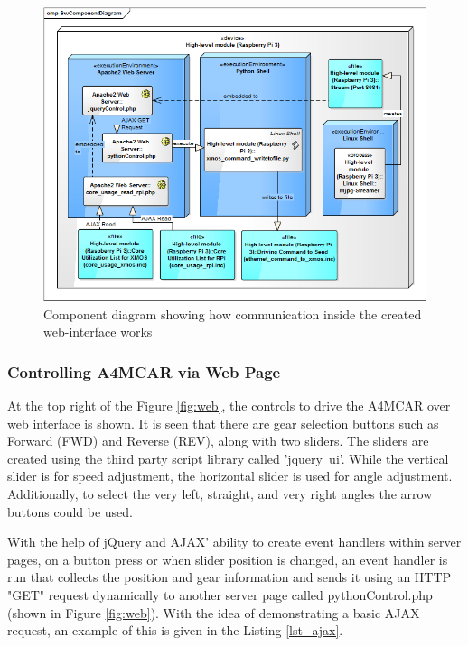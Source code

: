 \begin{figure}[!ht]
	\includegraphics[scale=0.64]{content/images/weboverallbehavior.png}
	\caption{Component diagram showing how communication inside the created web-interface works}
	\label{fig:weboverallbehavior}
\end{figure}

\subsubsection{Controlling A4MCAR via Web Page}
At the top right of the Figure \ref{fig:web}, the controls to drive the A4MCAR over web interface is shown. It is seen that there are gear selection buttons such as Forward (FWD) and Reverse (REV), along with two sliders. The sliders are created using the third party script library called 'jquery\texttt{\_}ui'. While the vertical slider is for speed adjustment, the horizontal slider is used for angle adjustment. Additionally, to select the very left, straight, and very right angles the arrow buttons could be used. 

With the help of jQuery and AJAX' ability to create event handlers within server pages, on a button press or when slider position is changed, an event handler is run that collects the position and gear information and sends it using an HTTP "GET" request dynamically to another server page called pythonControl.php (shown in Figure \ref{fig:web}). With the idea of demonstrating a basic AJAX request, an example of this is given in the Listing \ref{lst_ajax}.



